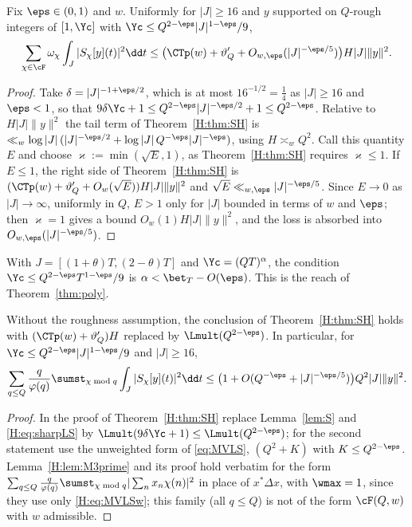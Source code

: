 \begin{corollary}\label{H:cor:SH1}
Fix $\eps\in(0,1)$ and $w$. Uniformly for $|J|\ge16$ and $y$ supported on $Q$-rough integers of $[1,\Yc]$ with $\Yc\le Q^{2-\eps}|J|^{1-\eps}/9$,
\[
\sum_{\chi\in\cF}\omega_\chi\int_J|S_\chi[y](t)|^2\dd t\le\big(\CTp(w)+\vartheta'_Q+O_{w,\eps}(|J|^{-\eps/5})\big)H|J|\|y\|^2 .
\]
\end{corollary}
\begin{proof}
Take $\delta=|J|^{-1+\eps/2}$, which is at most $16^{-1/2}=\frac14$ as $|J|\ge16$ and $\eps<1$, so that $9\delta\Yc+1\le Q^{2-\eps}|J|^{-\eps/2}+1\le Q^{2-\eps}$. Relative to $H|J|\|y\|^2$ the tail term of Theorem~\ref{H:thm:SH} is $\ll_w\log|J|\,(|J|^{-\eps/2}+\log|J|\,Q^{-\eps}|J|^{-\eps})$, using $H\asymp_wQ^2$. Call this quantity $E$ and choose $\varkappa:=\min(\sqrt E,1)$, as Theorem~\ref{H:thm:SH} requires $\varkappa\le1$. If $E\le1$, the right side of Theorem~\ref{H:thm:SH} is $(\CTp(w)+\vartheta'_Q+O_w(\sqrt E))H|J|\|y\|^2$ and $\sqrt E\ll_{w,\eps}|J|^{-\eps/5}$. Since $E\to0$ as $|J|\to\infty$, uniformly in $Q$, $E>1$ only for $|J|$ bounded in terms of $w$ and $\eps$; then $\varkappa=1$ gives a bound $O_w(1)H|J|\|y\|^2$, and the loss is absorbed into $O_{w,\eps}(|J|^{-\eps/5})$.
\end{proof}

With $J=[(1+\theta)T,(2-\theta)T]$ and $\Yc=(QT)^\alpha$, the condition $\Yc\le Q^{2-\eps}T^{1-\eps}/9$ is $\alpha<\bet_T-O(\eps)$. This is the reach of Theorem~\ref{thm:poly}.

\begin{corollary}\label{H:cor:SH2}
Without the roughness assumption, the conclusion of Theorem~\ref{H:thm:SH} holds with $(\CTp(w)+\vartheta'_Q)H$ replaced by $\Lmult(Q^{2-\eps})$. In particular, for $\Yc\le Q^{2-\eps}|J|^{1-\eps}/9$ and $|J|\ge16$,
\[
\sum_{q\le Q}\frac q{\varphi(q)}\sumst_{\chi\bmod q}\int_J|S_\chi[y](t)|^2\dd t\le\big(1+O(Q^{-\eps}+|J|^{-\eps/5})\big)Q^2|J|\|y\|^2 .
\]
\end{corollary}
\begin{proof}
In the proof of Theorem~\ref{H:thm:SH} replace Lemma~\ref{lem:S} and \eqref{H:eq:sharpLS} by $\Lmult(9\delta\Yc+1)\le\Lmult(Q^{2-\eps})$; for the second statement use the unweighted form of \eqref{eq:MVLS}, $(Q^2+K)$ with $K\le Q^{2-\eps}$. Lemma~\ref{H:lem:M3prime} and its proof hold verbatim for the form $\sum_{q\le Q}\frac q{\varphi(q)}\sumst_{\chi\bmod q}|\sum_nx_n\chi(n)|^2$ in place of $x^*\Delta x$, with $\wmax=1$, since they use only \eqref{H:eq:MVLSw}; this family (all $q\le Q$) is not of the form $\cF(Q,w)$ with $w$ admissible.
\end{proof}

